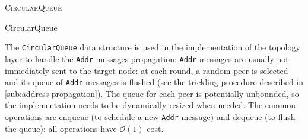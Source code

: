 \medskip
\begin{algorithm}[h]
	\DontPrintSemicolon



	\BlankLine
	 \;
	\textsc{CircularQueue}  \;

	\BlankLine
	 \;
	\Void {} \;

	\BlankLine
	 \;
	\Object \Dequeue{} \;

	\BlankLine
	 \;
	\Object \Head{} \;

	\BlankLine
	 \;
	\Boolean \IsEmpty{} \;

	\caption{CircularQueue}
	\label{alg:circular-queue}
\end{algorithm}
\smallskip

The \texttt{CircularQueue} data structure is used in the implementation of the topology layer to handle the \texttt{Addr} messages propagation:
\texttt{Addr} messages are usually not immediately sent to the target node:
at each round, a random peer is selected and its queue of \texttt{Addr} messages is flushed (see the trickling procedure described in \cref{sub:address-propagation}).
The queue for each peer is potentially unbounded, so the implementation needs to be dynamically resized when needed.
The common operations are enqueue (to schedule a new \texttt{Addr} message) and dequeue (to flush the queue):
all operations have $\mathcal{O}(1)$ cost.
